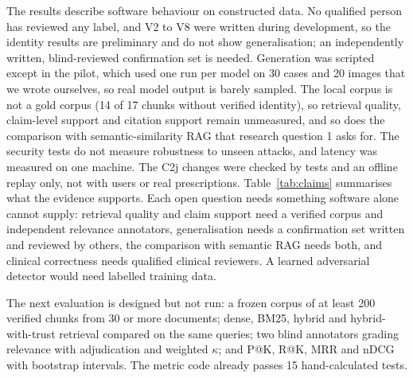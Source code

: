 \documentclass[conference]{IEEEtran}
\begin{document}
The results describe software behaviour on constructed data. No qualified person has reviewed any label, and V2 to V8
were written during development, so the identity results are preliminary and do not show generalisation; an
independently written, blind-reviewed confirmation set is needed. Generation was scripted except in the pilot, which
used one run per model on 30 cases and 20 images that we wrote ourselves, so real model output is barely sampled. The local corpus is not a gold corpus (14 of 17 chunks without verified identity), so retrieval quality,
claim-level support and citation support remain unmeasured, and so does the comparison with semantic-similarity RAG that
research question 1 asks for. The security tests do not measure robustness to unseen attacks, and latency was measured on
one machine. The C2j changes were checked by tests and an offline replay only, not with users or real prescriptions.
Table~\ref{tab:claims} summarises what the evidence supports. Each open question needs something software alone
cannot supply: retrieval quality and claim support need a verified corpus and independent relevance annotators,
generalisation needs a confirmation set written and reviewed by others, the comparison with semantic RAG needs both,
and clinical correctness needs qualified clinical reviewers. A learned adversarial detector would need labelled
training data.

The next evaluation is designed but not run: a frozen corpus of at least 200 verified chunks from 30 or more documents;
dense, BM25, hybrid and hybrid-with-trust retrieval compared on the same queries; two blind annotators grading relevance
with adjudication and weighted $\kappa$; and P@K, R@K, MRR and nDCG with bootstrap intervals. The metric code already
passes 15 hand-calculated tests.
\end{document}
